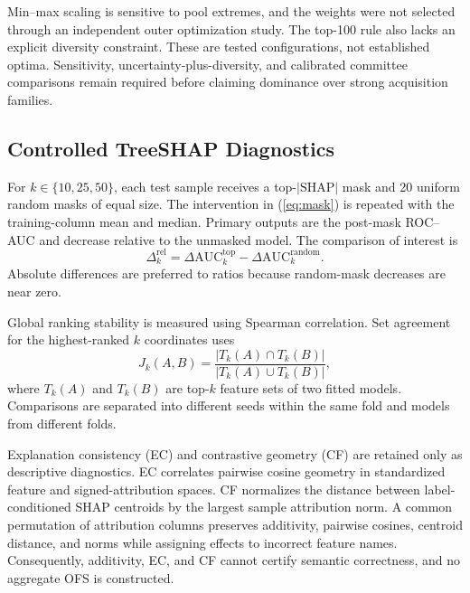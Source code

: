 Min--max scaling is sensitive to pool extremes, and the weights were not selected
through an independent outer optimization study. The top-100 rule also lacks an
explicit diversity constraint. These are tested configurations, not established
optima. Sensitivity, uncertainty-plus-diversity, and calibrated committee
comparisons remain required before claiming dominance over strong acquisition
families.

\subsection{Controlled TreeSHAP Diagnostics}

For $k\in\{10,25,50\}$, each test sample receives a top-$|\mathrm{SHAP}|$ mask
and 20 uniform random masks of equal size. The intervention in
(\ref{eq:mask}) is repeated with the training-column mean and median. Primary
outputs are the post-mask ROC--AUC and decrease relative to the unmasked model.
The comparison of interest is
\begin{equation}
\Delta_k^{\mathrm{rel}}=
\Delta\mathrm{AUC}_{k}^{\mathrm{top}}-
\Delta\mathrm{AUC}_{k}^{\mathrm{random}}.
\label{eq:relative-deletion}
\end{equation}
Absolute differences are preferred to ratios because random-mask decreases are
near zero.

Global ranking stability is measured using Spearman correlation. Set agreement
for the highest-ranked $k$ coordinates uses
\begin{equation}
J_k(A,B)=\frac{|T_k(A)\cap T_k(B)|}{|T_k(A)\cup T_k(B)|},
\label{eq:jaccard}
\end{equation}
where $T_k(A)$ and $T_k(B)$ are top-$k$ feature sets of two fitted models.
Comparisons are separated into different seeds within the same fold and models
from different folds.

Explanation consistency (EC) and contrastive geometry (CF) are retained only as
descriptive diagnostics. EC correlates pairwise cosine geometry in standardized
feature and signed-attribution spaces. CF normalizes the distance between
label-conditioned SHAP centroids by the largest sample attribution norm. A common
permutation of attribution columns preserves additivity, pairwise cosines,
centroid distance, and norms while assigning effects to incorrect feature names.
Consequently, additivity, EC, and CF cannot certify semantic correctness, and no
aggregate OFS is constructed.


